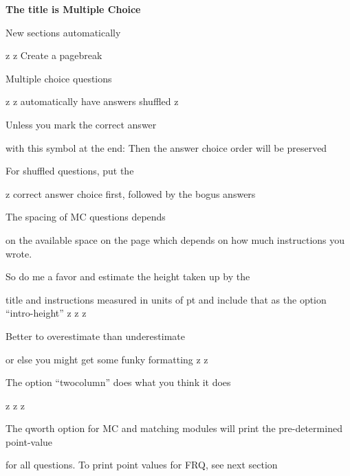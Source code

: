 \documentclass{exam}
\begin{document}
\newpage
\par\noindent \textbf{\large  The title is Multiple Choice}
\setlength{\columnsep}{0.40 in}
\begin{multicols*}{2}
\renewcommand{\choiceshook}{\setlength{\leftmargin}{0.40 in}}
\renewcommand{\questionshook}{\setlength{\leftmargin}{0.0 in}}
\begin{questions}
\setcounter{question}{18}
	\question[2] New sections automatically
	\begin{choices}
		\choice z
		\choice z
		\CorrectChoice Create a pagebreak
	\end{choices}
	\question[2] Multiple choice questions
	\begin{choices}
		\choice z
		\choice z
		\CorrectChoice automatically have answers shuffled
		\choice z
	\end{choices}
	\question[2] Unless you mark the correct answer
	\begin{choices}
		\CorrectChoice with this symbol at the end:
		\choice Then the answer choice order
		\choice will be
		\choice preserved
	\end{choices}
	\question[2] For shuffled questions, put the
	\begin{choices}
		\choice z
		\CorrectChoice correct answer choice first,
		\choice followed by the bogus answers
	\end{choices}
	\question[2] The spacing of MC questions depends
	\begin{choices}
		\choice on the available space on the page
		\CorrectChoice which depends on how much instructions you wrote.
	\end{choices}
	\question[2] So do me a favor and estimate the height taken up by the
	\begin{choices}
		\choice title and instructions
		\CorrectChoice measured in units of pt
		\choice and include that as the option ``intro-height''
		\choice z
		\choice z
		\choice z
	\end{choices}
	\question[2] Better to overestimate than underestimate
	\begin{choices}
		\CorrectChoice or else you might get some funky formatting
		\choice z
		\choice z
	\end{choices}
	\vfill\null\columnbreak
	\question[2] The option ``twocolumn'' does what you think it does
	\begin{choices}
		\CorrectChoice z
		\CorrectChoice z
		\CorrectChoice z
	\end{choices}
	\question[2] The qworth option for MC and matching modules will print the pre-determined point-value
	\begin{choices}
		\CorrectChoice for all questions.
		\choice To print point values for FRQ, see next section
	\end{choices}
\end{questions}
\end{multicols*}
\renewcommand{\choiceshook}{}
\renewcommand{\questionshook}{}
\end{document}
